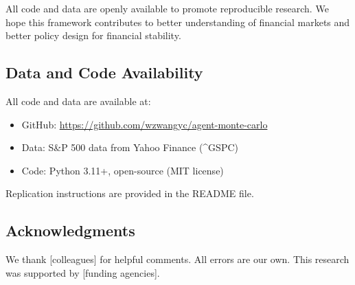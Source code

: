 All code and data are openly available to promote reproducible research. We hope this framework contributes to better understanding of financial markets and better policy design for financial stability.

\subsection*{Data and Code Availability}

All code and data are available at:
\begin{itemize}
    \item GitHub: \url{https://github.com/wzwangyc/agent-monte-carlo}
    \item Data: S\&P 500 data from Yahoo Finance (\textasciicircum GSPC)
    \item Code: Python 3.11+, open-source (MIT license)
\end{itemize}

Replication instructions are provided in the README file.

\subsection*{Acknowledgments}

We thank [colleagues] for helpful comments. All errors are our own. This research was supported by [funding agencies].
